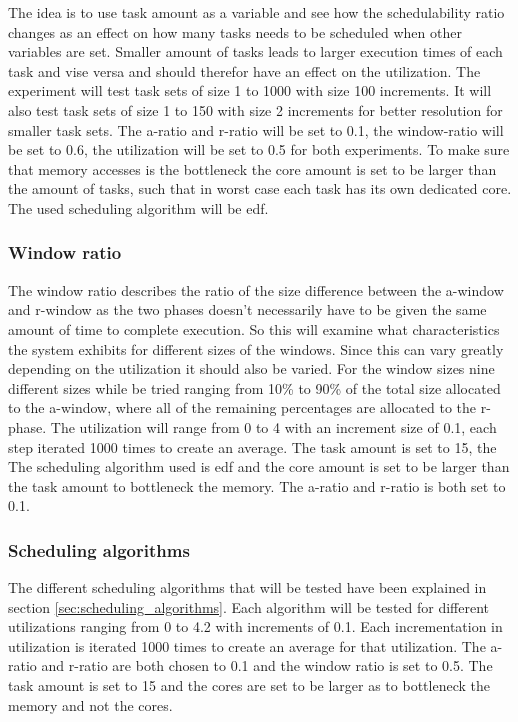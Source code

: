 \documentclass{kththesis}
\begin{document}
The idea is to use task amount as a variable and see how the schedulability ratio changes as an
effect on how many tasks needs to be scheduled when other variables are set. Smaller amount of tasks
leads to larger execution times of each task and vise versa and should therefor have an effect on
the utilization. The experiment will test task sets of size 1 to 1000 with size 100 increments. It
will also test task sets of size 1 to 150 with size 2 increments for better resolution for smaller
task sets. The \acrshort{a}-ratio and \acrshort{r}-ratio will be set to 0.1, the window-ratio will
be set to 0.6, the utilization will be set to 0.5 for both experiments. To make sure that memory
accesses is the bottleneck the core amount is set to be larger than the amount of tasks, such that
in worst case each task has its own dedicated core. The used scheduling algorithm will be
\acrshort{edf}.

\subsubsection{Window ratio}

The window ratio describes the ratio of the size difference between the \acrshort{a}-window and
\acrshort{r}-window as the two phases doesn't necessarily have to be given the same amount of time
to complete execution. So this will examine what characteristics the system exhibits for different
sizes of the windows. Since this can vary greatly depending on the utilization it should also be
varied. For the window sizes nine different sizes while be tried ranging from 10\% to 90\% of the
total size allocated to the \acrshort{a}-window, where all of the remaining percentages are
allocated to the \acrshort{r}-phase. The utilization will range from 0 to 4 with an increment size
of 0.1, each step iterated 1000 times to create an average. The task amount is set to 15, the The
scheduling algorithm used is \acrshort{edf} and the core amount is set to be larger than the task
amount to bottleneck the memory. The \acrshort{a}-ratio and \acrshort{r}-ratio is both set to 0.1.

\subsubsection{Scheduling algorithms}

The different scheduling algorithms that will be tested have been explained in section
\ref{sec:scheduling_algorithms}. Each algorithm will be tested for different utilizations ranging
from 0 to 4.2 with increments of 0.1. Each incrementation in utilization is iterated 1000 times to
create an average for that utilization. The \acrshort{a}-ratio and \acrshort{r}-ratio are both
chosen to 0.1 and the window ratio is set to 0.5. The task amount is set to 15 and the cores are set
to be larger as to bottleneck the memory and not the cores.
\end{document}
